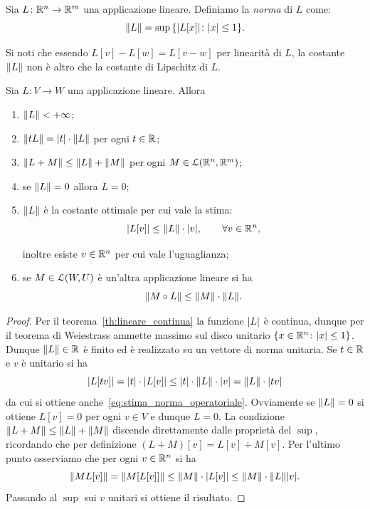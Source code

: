 \begin{definition}
Sia $L\colon {\mathbb R}^n \to {\mathbb R}^m$ una applicazione lineare.
Definiamo la \emph{norma} di $L$ come:
  \[
  {\left\Vert L\right\Vert} = \sup {\left\{ {\left|L[ x]\right|}\colon {\left| x\right|}\le 1 \right\}}.
  \]

Si noti che essendo $L[v]-L[w] = L[v-w]$ per linearità di $L$, 
la costante ${\left\Vert L\right\Vert}$ non è altro che la costante di Lipschitz di $L$.
\end{definition}

\begin{theorem}
  Sia $L\colon V \to W$ una applicazione lineare. 
  Allora 
  \begin{enumerate}
    \item ${\left\Vert L\right\Vert} < +\infty$;
    \item ${\left\Vert tL\right\Vert} = {\left|t\right|}\cdot {\left\Vert L\right\Vert}$ per ogni $t\in {\mathbb R}$;
    \item ${\left\Vert L+M\right\Vert} \le {\left\Vert L\right\Vert} + {\left\Vert M\right\Vert}$ per ogni $M\in \mathcal L({\mathbb R}^n,{\mathbb R}^m)$;
    \item se ${\left\Vert L\right\Vert} = 0$ allora $L=0$; 
    \item ${\left\Vert L\right\Vert}$ è la costante ottimale per cui vale 
    la stima:
    \begin{equation}
      \label{eq:stima_norma_operatoriale}  
      {\left|L[ v]\right|} \le {\left\Vert L\right\Vert} \cdot {\left| v\right|},
      \qquad \forall  v \in {\mathbb R}^n,
    \end{equation}

    inoltre esiste $ v\in{\mathbb R}^n$ per cui vale 
    l'uguaglianza;
    \item se $M\in \mathcal L(W,U)$ è un'altra applicazione 
    lineare si ha 
    \[
      {\left\Vert M\circ L\right\Vert} \le {\left\Vert M\right\Vert} \cdot {\left\Vert L\right\Vert}.
    \]
  \end{enumerate}
\end{theorem}
%
\begin{proof}
Per il teorema~\ref{th:lineare_continua} la funzione ${\left|L\right|}$ è continua,
dunque per il teorema di Weiestrass ammette massimo sul disco
unitario ${\left\{  x \in {\mathbb R}^n\colon {\left|x\right|}\le 1 \right\}}$.
Dunque ${\left\Vert L\right\Vert}\in {\mathbb R}$ è finito ed è realizzato 
su un vettore di norma unitaria.
Se $t\in {\mathbb R}$ e $ v$ è unitario si ha
\[
  {\left|L[t v]\right|} = {\left|t\right|}\cdot {\left|L[ v]\right|}
  \le {\left|t\right|}\cdot {\left\Vert L\right\Vert} \cdot {\left| v\right|} 
  = {\left\Vert L\right\Vert} \cdot {\left|t v\right|}
\]
da cui si ottiene anche~\ref{eq:stima_norma_operatoriale}.
Ovviamente se ${\left\Vert L\right\Vert}=0$ si ottiene $L[v]=0$ per ogni $v\in V$ 
e dunque $L=0$.
La condizione ${\left\Vert L+M\right\Vert}\le {\left\Vert L\right\Vert} + {\left\Vert M\right\Vert}$ 
discende direttamente dalle proprietà del $\sup$, ricordando 
che per definizione $(L+M)[v] = L[v] + M[v]$.
Per l'ultimo punto osserviamo che per ogni $ v\in {\mathbb R}^n$ si ha 
\[
  {\left\Vert ML[ v]\right\Vert} = {\left\Vert M[L[ v]]\right\Vert}
  \le {\left\Vert M\right\Vert}\cdot {\left|L[ v]\right|}
  \le {\left\Vert M\right\Vert}\cdot {\left\Vert L\right\Vert}{\left| v\right|}.
\]
Passando al $\sup$ sui $ v$ unitari si ottiene il risultato.
\end{proof}

